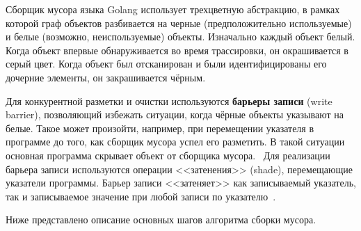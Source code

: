 Сборщик мусора языка Golang использует трехцветную абстракцию, в рамках которой граф объектов разбивается на черные (предположительно используемые) и белые (возможно, неиспользуемые) объекты. Изначально каждый объект белый. Когда объект впервые обнаруживается во время трассировки, он окрашивается в серый цвет. Когда объект был отсканирован и были идентифицированы его дочерние элементы, он закрашивается чёрным.~\cite{handbook}

Для конкурентной разметки и очистки используются \textbf{барьеры записи} (write barrier), позволяющий избежать ситуации, когда чёрные объекты указывают на белые. Такое может произойти, например, при перемещении указателя в программе до того, как сборщик мусора успел его разметить. В такой ситуации основная программа скрывает объект от сборщика мусора.~\cite{golang_gc} Для реализации барьера записи используются операции <<затенения>> (shade), перемещающие указатели программы. Барьер записи <<затеняет>> как записываемый указатель, так и записываемое значение при любой записи по указателю~\cite{golang_barrier}. 

Ниже представлено описание основных шагов алгоритма сборки мусора.~\cite{golang_gc}

